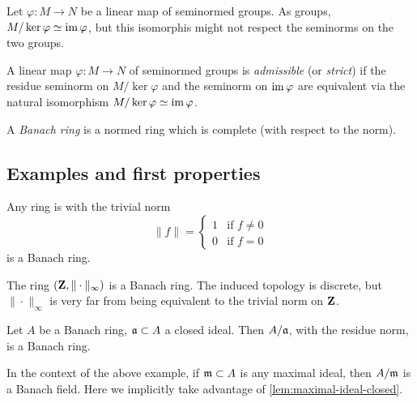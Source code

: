 Let $\varphi\colon M\to N$ be a linear map of seminormed groups. As groups, 
$M/\ker\varphi\simeq \operatorname{im}\varphi$, but this isomorphis might not respect the 
seminorms on the two groups. 

\begin{definition}
A linear map $\varphi\colon M\to N$ of seminormed groups is \emph{admissible} 
(or \emph{strict}) if the residue seminorm on $M/\ker\varphi$ and the seminorm 
on $\operatorname{im}\varphi$ are equivalent via the natural isomorphism 
$M/\ker\varphi\simeq \operatorname{im}\varphi$. 
\end{definition}

\begin{definition}
A \emph{Banach ring} is a normed ring which is complete (with respect to the 
norm). 
\end{definition}


\subsection{Examples and first properties}

\begin{example}
Any ring is with the trivial norm 
\[
  \|f\| = \begin{cases} 1 & \text{if }f\ne 0 \\ 0 & \text{if }f=0 \end{cases}
\]
is a Banach ring. 
\end{example}

\begin{example}
The ring $(\mathbf{Z},\|\cdot\|_\infty)$ is a Banach ring. The induced topology is 
discrete, but $\|\cdot\|_\infty$ is very far from being equivalent to the 
trivial norm on $\mathbf{Z}$. 
\end{example}

\begin{example}
Let $A$ be a Banach ring, $\mathfrak{a}\subset A$ a closed ideal. Then $A/\mathfrak{a}$, with the 
residue norm, is a Banach ring. 
\end{example}

\begin{example}
In the context of the above example, if $\mathfrak{m}\subset A$ is any maximal ideal, 
then $A/\mathfrak{m}$ is a Banach field. Here we implicitly take advantage of 
\autoref{lem:maximal-ideal-closed}. 
\end{example}

